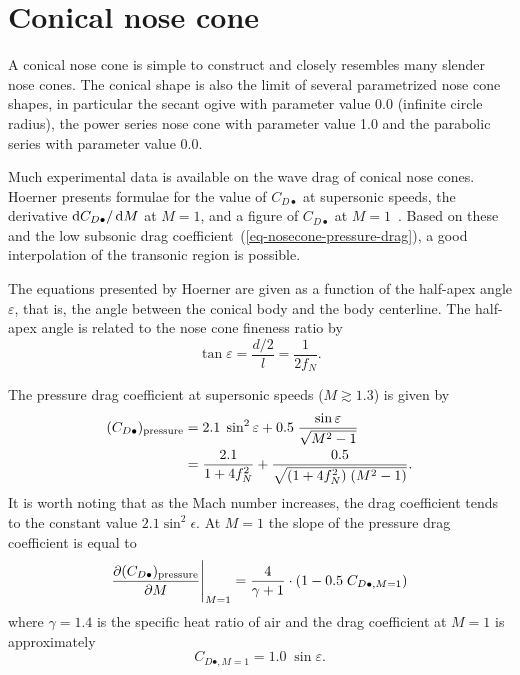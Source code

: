 \section{Conical nose cone}

A conical nose cone is simple to construct and closely resembles many
slender nose cones.  The conical shape is also the limit of several
parametrized nose cone shapes, in particular the secant ogive with
parameter value 0.0 (infinite circle radius), the power series nose
cone with parameter value 1.0 and the parabolic series with parameter
value 0.0.

Much experimental data is available on the wave drag of conical nose
cones.  Hoerner presents formulae for the value of $C_{D\bullet}$ at
supersonic speeds, the derivative  $\dif C_{D\bullet}/\dif M$ at
$M=1$,  and a figure of $C_{D\bullet}$ at
$M=1$~\cite[pp.~16-18\ldots16-20]{hoerner}.  Based on these and 
the low subsonic drag coefficient~(\ref{eq-nosecone-pressure-drag}), a
good interpolation of the transonic region is possible.

The equations presented by Hoerner are given as a function of the
half-apex angle $\varepsilon$, that is, the angle between the conical
body and the body centerline.  The half-apex angle is related to the
nose cone fineness ratio by
%
\begin{equation}
\tan\varepsilon = \frac{d/2}{l} = \frac{1}{2f_N}.
\end{equation}

The pressure drag coefficient at supersonic speeds ($M\gtrsim1.3$) is
given by
%
\begin{align}
(C_{D\bullet})_{\rm pressure}
& =  2.1\;\sin^2\varepsilon + 0.5\;
                 \frac{\sin\varepsilon}{\sqrt{M^2-1}} \nonumber\\
& =  \frac{2.1}{1+4f_N^2} + \frac{0.5}{\sqrt{(1+4f_N^2)\; (M^2-1)}} .
\label{eq-conical-supersonic-drag}
\end{align}
%
It is worth noting that as the Mach number increases, the drag
coefficient tends to the constant value $2.1\sin^2\epsilon$.  At $M=1$
the slope of the pressure drag coefficient is equal to
%
\begin{equation}
\eval{\frac{\partial (C_{D\bullet})_{\rm pressure}}{\partial M}}_{M=1} =
  \frac{4}{\gamma+1} \cdot (1-0.5\;C_{D\bullet,M=1})
\label{eq-conical-sonic-drag-derivative}
\end{equation}
%
where $\gamma=1.4$ is the specific heat ratio of air and the drag
coefficient at $M=1$ is approximately
%
\begin{equation}
C_{D\bullet,M=1} = 1.0\; \sin\varepsilon.
\label{eq-conical-sonic-drag}
\end{equation}

